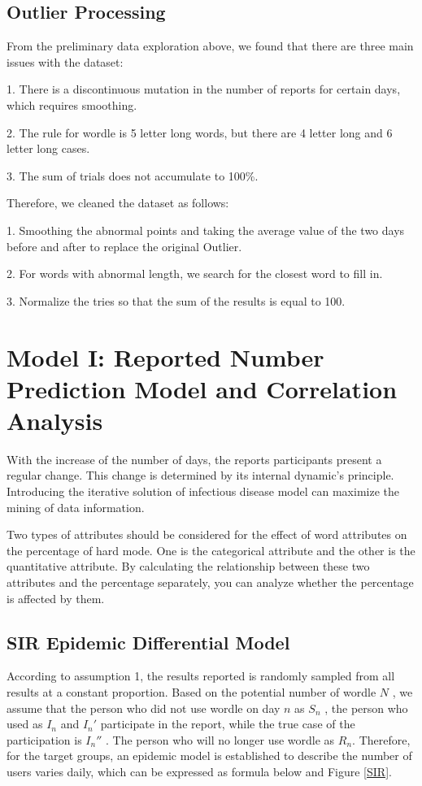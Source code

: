 \documentclass[
  journal=medium,
  manuscript=Report,
  year=2023,
  volume=37,
]{cup-journal}
\begin{document}
\subsection{Outlier Processing}

From the preliminary data exploration above, we found that there are three main issues with the dataset: 

1. There is a discontinuous mutation in the number of reports for certain days, which requires smoothing. 

2. The rule for wordle is 5 letter long words, but there are 4 letter long and 6 letter long cases.

3. The sum of trials does not accumulate to 100\%.

Therefore, we cleaned the dataset as follows:

1. Smoothing the abnormal points and taking the average value of the two days before and after to replace the original Outlier.

2. For words with abnormal length, we search for the closest word to fill in.

3. Normalize the tries so that the sum of the results is equal to 100.

\section{Model I: Reported Number Prediction Model and Correlation Analysis}

With the increase of the number of days, the reports participants present a regular change. This change is determined by its internal dynamic’s principle. Introducing the iterative solution of infectious disease model can maximize the mining of data information. 

Two types of attributes should be considered for the effect of word attributes on the percentage of hard mode. One is the categorical attribute and the other is the quantitative attribute. By calculating the relationship between these two attributes and the percentage separately, you can analyze whether the percentage is affected by them. 

\subsection{SIR Epidemic Differential Model}

According to assumption 1, the results reported is randomly sampled from all results at a constant proportion. Based on the potential number of wordle $N$ , we assume that the person who did not use wordle on day $n$ as $S_n$ , the person who used as $I_n$ and $I_n'$ participate in the report, while the true case of the participation is $I_n''$ . The person who will no longer use wordle as $R_n$. Therefore, for the target groups, an epidemic model is established to describe the number of users varies daily, which can be expressed as formula below and Figure \ref{SIR}.
\end{document}
